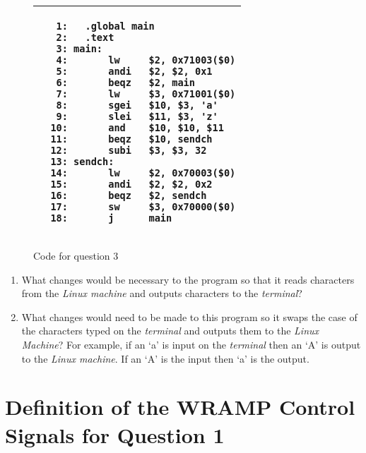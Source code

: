 \documentclass[a4paper,10pt]{article}
\begin{document}
\begin{enumerate}
\begin{figure}[h]
\begin{small}
\begin{center}
\begin{tabular}{|p{6cm}|}
\hline
\begin{verbatim}
   1:	.global main
   2:	.text
   3: main:
   4:       lw     $2, 0x71003($0)
   5:       andi   $2, $2, 0x1
   6:       beqz   $2, main
   7:       lw     $3, 0x71001($0)
   8:       sgei   $10, $3, 'a'
   9:       slei   $11, $3, 'z'
  10:       and    $10, $10, $11
  11:       beqz   $10, sendch
  12:       subi   $3, $3, 32
  13: sendch:	  	
  14:       lw     $2, 0x70003($0)
  15:       andi   $2, $2, 0x2
  16:       beqz   $2, sendch
  17:       sw     $3, 0x70000($0)
  18:       j      main
\end{verbatim}
\\
\hline
\end{tabular}
\end{center}
\end{small}
\caption{Code for question 3}
\label{q2_prog}
\end{figure}

\begin{enumerate} %


\item What changes would be necessary to the program so that it reads
characters from the \emph{Linux machine} and outputs characters to the
\emph{terminal}?


\item What changes would need to be made to this program so it swaps the
case of the characters typed on the \emph{terminal} and outputs them
to the \emph{Linux Machine}? For example, if an `a' is input on the
\emph{terminal} then an `A' is output to the \emph{Linux
machine}. If an `A' is the input then `a' is the output.



\end{enumerate}

\end{enumerate}



\appendix
\newpage
\section{Definition of the WRAMP Control Signals for Question 1} 
\label{cntrl_sig_defn}
\end{document}
